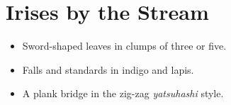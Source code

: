 \documentclass[11pt,DIV=10]{scrartcl}
\begin{document}
\section{Irises by the Stream}
\begin{itemize}
\item Sword-shaped leaves in clumps of three or five.
\item Falls and standards in indigo and lapis.
\item A plank bridge in the zig-zag \emph{yatsuhashi} style.
\end{itemize}
\begin{quote}\lipsum[1]\end{quote}
\lipsum[2-8]
\end{document}
